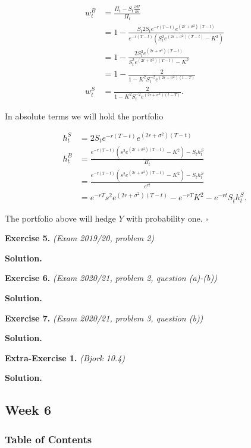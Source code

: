 \documentclass[
]{article}
\begin{document}
\begin{align*}
w_t^B&=\frac{\Pi_t-S_t\frac{\partial\Pi}{\partial s}}{\Pi_t}\\
&=1-\frac{S_t2S_te^{-r(T-t)}e^{(2r+\sigma^2)(T-t)}}{e^{-r(T-t)}\left(S_t^2e^{(2r+\sigma^2)(T-t)}-K^2\right)}\\
&=1-\frac{2S_t^2e^{(2r+\sigma^2)(T-t)}}{S_t^2e^{(2r+\sigma^2)(T-t)}-K^2}\\
&=1-\frac{2}{1-K^2S_t^{-2}e^{(2r+\sigma^2)(t-T)}}\\
w_t^S&=\frac{2}{1-K^2S_t^{-2}e^{(2r+\sigma^2)(t-T)}}.
\end{align*}

In absolute terms we will hold the portfolio

\begin{align*}
h_t^S&=2S_te^{-r(T-t)}e^{(2r+\sigma^2)(T-t)}\\
h_t^B&=\frac{e^{-r(T-t)}\left(s^2e^{(2r+\sigma^2)(T-t)}-K^2\right)-S_th_t^S}{B_t}\\
&=\frac{e^{-r(T-t)}\left(s^2e^{(2r+\sigma^2)(T-t)}-K^2\right)-S_th_t^S}{e^{rt}}\\
&=e^{-rT}s^2e^{(2r+\sigma^2)(T-t)}-e^{-rT}K^2-e^{-rt}S_th_t^S.
\end{align*}

The portfolio above will hedge \(Y\) with probability one. \(\square\)

\textbf{Exercise 5.} \emph{(Exam 2019/20, problem 2)}

\textbf{Solution.}

\textbf{Exercise 6.} \emph{(Exam 2020/21, problem 2, question (a)-(b))}

\textbf{Solution.}

\textbf{Exercise 7.} \emph{(Exam 2020/21, problem 3, question (b))}

\textbf{Solution.}

\textbf{Extra-Exercise 1.} \emph{(Bjork 10.4)}

\textbf{Solution.}

\hypertarget{week-6}{%
\subsection{Week 6}\label{week-6}}

\hypertarget{table-of-contents-5}{%
\subsubsection{Table of Contents}\label{table-of-contents-5}}
\end{document}
